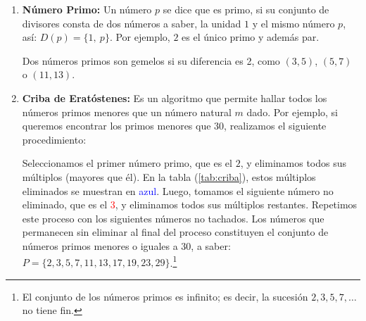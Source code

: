 \begin{enumerate}
    \item \textbf{Número Primo:} Un número $p$ se dice que es primo, si su conjunto de divisores consta de dos números a saber, la unidad $1$ y el mismo número $p$, así: $D(p) = \{1,\ p\}$.
    Por ejemplo, $2$ es el único primo y además par.
    
    \begin{ejemplo}
        Dos números primos son gemelos si su diferencia es 2, como $(3,5)$, $(5,7)$ o $(11,13)$.
    \end{ejemplo}

    \item \textbf{Criba de Eratóstenes:} Es un algoritmo que permite hallar todos los números primos menores que un número natural $m$ dado. Por ejemplo, si queremos encontrar los primos menores que $30$, realizamos el siguiente procedimiento:

    Seleccionamos el primer número primo, que es el $2$, y eliminamos todos sus múltiplos (mayores que él). En la tabla (\ref{tab:criba}), estos múltiplos eliminados se muestran en \textcolor{blue}{azul}. Luego, tomamos el siguiente número no eliminado, que es el \textcolor{red}{3}, y eliminamos todos sus múltiplos restantes. Repetimos este proceso con los siguientes números no tachados. Los números que permanecen sin eliminar al final del proceso constituyen el conjunto de números primos menores o iguales a $30$, a saber: $P=\{2,3,5,7,11,13,17,19,23,29\}$.\footnote{El conjunto de los números primos es infinito; es decir, la sucesión $2,3,5,7,\dots$ no tiene fin.}

\begin{table}[ht]
\caption{Criba de Eratóstenes}\label{tab:criba}
\centering
{}
\end{table}
\end{enumerate}
